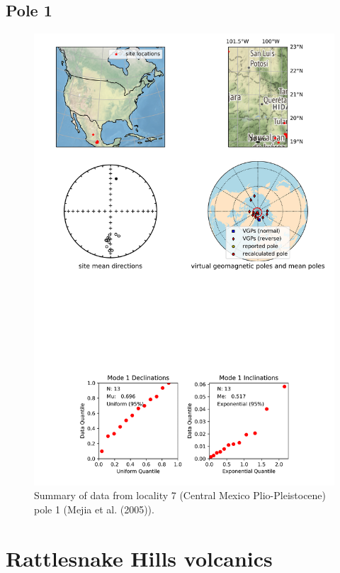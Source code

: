 \documentclass{article}
\begin{document}
\subsection{Pole 1}


\begin{figure}[H]
\centering
\includegraphics[width=5 in]{./7/1/pole_summary.png}
\caption{Summary of data from locality 7 (Central Mexico Plio-Pleistocene) pole 1 (Mejia et al. (2005)).}
\end{figure}

\section{Rattlesnake Hills volcanics}
\end{document}
